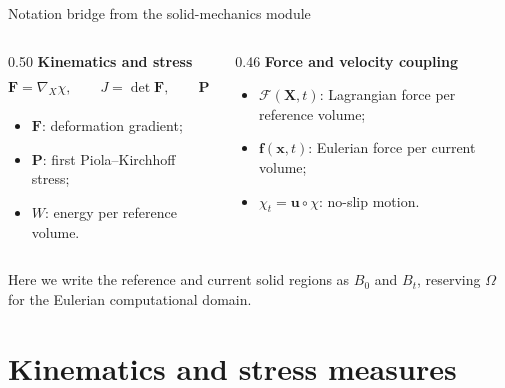 \documentclass[aspectratio=169,11pt]{beamer}
\newcommand{\xvec}{\bm{x}}
\newcommand{\Xvec}{\bm{X}}
\newcommand{\uvec}{\bm{u}}
\newcommand{\fvec}{\bm{f}}
\newcommand{\Fvec}{\bm{\mathcal{F}}}
\newcommand{\Ften}{\bm{F}}
\newcommand{\Pten}{\bm{P}}
\newcommand{\Grad}{\nabla_{\!X}}
\begin{document}
\begin{frame}{Notation bridge from the solid-mechanics module}
\begin{columns}[T,onlytextwidth]
\begin{column}{0.50\textwidth}
\textbf{Kinematics and stress}
\[
  \Ften=\Grad\chi,
  \qquad
  J=\det\Ften,
  \qquad
  \Pten=\frac{\partial W}{\partial\Ften}.
\]
\begin{itemize}\itemsep5pt
  \item \(\Ften\): deformation gradient;
  \item \(\Pten\): first Piola--Kirchhoff stress;
  \item \(W\): energy per reference volume.
\end{itemize}
\end{column}
\begin{column}{0.46\textwidth}
\textbf{Force and velocity coupling}
\begin{itemize}\itemsep7pt
  \item \(\Fvec(\Xvec,t)\): Lagrangian force per reference volume;
  \item \(\fvec(\xvec,t)\): Eulerian force per current volume;
  \item \(\chi_t=\uvec\circ\chi\): no-slip motion.
\end{itemize}
\end{column}
\end{columns}
\medskip
\begin{punchbox}
\small Here we write the reference and current solid regions as \(B_0\) and \(B_t\), reserving \(\Omega\) for the Eulerian computational domain.
\end{punchbox}
\end{frame}

\section{Kinematics and stress measures}
\end{document}
